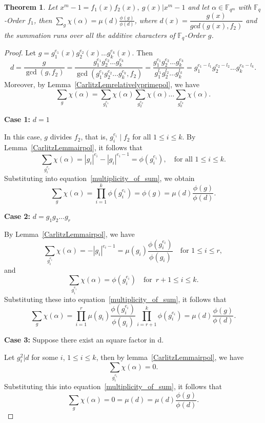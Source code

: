 \documentclass[12pt,a4paper]{article}
\theoremstyle{plain}
\newtheorem{thm}{Theorem}[section]
\theoremstyle{definition}
\numberwithin{equation}{section}
\begin{document}
    \begin{thm}\label{Sumaddi}
        Let $x^m-1 = f_1(x)f_2(x), ~g(x) \vert x^m-1$ and let $\alpha \in \mathbb{F}_{q^m}$ with $\mathbb{F}_q$-Order $f_1$, then
        $\displaystyle\sum_{g} \chi (\alpha) = \mu \left (d \right)\frac{\phi(g)}{\phi\left(d\right)}$, where $d(x) = \dfrac{g(x)}{gcd \left(g(x),f_2\right)}$ and the summation runs over all the additive characters of $\mathbb{F}_q$-Order $g$. 
    \end{thm}
    \begin{proof}
        Let \(g = g_1^{e_1}(x)g_2^{e_2}(x)\dots g_k^{e_k}(x)\). Then
        \[
        d = \frac{g}{\gcd(g, f_2)} = \frac{g_1^{e_1}g_2^{e_2}\dots g_k^{e_k}}{\gcd(g_1^{e_1}g_2^{e_2}\dots g_k^{e_k}, f_2)} = \frac{g_1^{e_1}g_2^{e_2}\dots g_k^{e_k}}{g_1^{l_1}g_2^{l_2}\dots g_k^{l_k}} = g_1^{e_1-l_1}g_2^{e_2-l_2}\dots g_k^{e_k-l_k}.\]
        Moreover, by Lemma~\ref{CarlitzLemrelativelyprimepol}, we have
        \begin{equation}
            \sum_{g} \chi(\alpha) = \sum_{g_1^{e_1}} \chi(\alpha) \sum_{g_2^{e_2}} \chi(\alpha) \dots \sum_{g_k^{e_k}} \chi(\alpha).
            \label{multiplicity_of_sum}
        \end{equation}

        \textbf{Case 1:} \(d = 1\)

        In this case, \(g\) divides \(f_2\), that is, \(g_i^{e_i} \mid f_2\) for all \(1 \leq i \leq k\). By Lemma~\ref{CarlitzLemmairpol}, it follows that
        \[
        \sum_{g_i^{e_i}} \chi(\alpha) = |g_i|^{e_i} - |g_i|^{e_i-1} = \phi(g_i^{e_i}), \quad \text{for all } 1 \leq i \leq k.
        \]
        Substituting into equation~\eqref{multiplicity_of_sum}, we obtain
        \[
        \sum_{g} \chi(\alpha) = \prod_{i=1}^{k} \phi(g_i^{e_i}) = \phi(g) = \mu(d)\frac{\phi(g)}{\phi(d)}.
        \]

        \textbf{Case 2:} \(d = g_1g_2\dots g_r\)

        By Lemma~\ref{CarlitzLemmairpol}, we have
        \[
        \sum_{g_i^{e_i}} \chi(\alpha) = -|g_i|^{e_i-1} = \mu(g_i) \frac{\phi(g_i^{e_i})}{\phi(g_i)} \quad \text{for } 1 \leq i \leq r,
        \]
        and
        \[
        \sum_{g_i^{e_i}} \chi(\alpha) = \phi(g_i^{e_i}) \quad \text{for } \, r+1 \leq i \leq k. 
        \]
        Substituting these into equation~\eqref{multiplicity_of_sum}, it follows that
        \[
        \sum_{g} \chi(\alpha) = \prod_{i=1}^{r} \mu(g_i) \frac{\phi(g_i^{e_i})}{\phi(g_i)} \prod_{i=r+1}^{k} \phi(g_i^{e_i}) = \mu(d) \frac{\phi(g)}{\phi(d)}.
        \]

        \textbf{Case 3:} Suppose there exist an square factor in d.

        Let $g_i^2 \vert d$ for some $i$, $1\leq i \leq k$, then by lemma~\ref{CarlitzLemmairpol}, we have
        \[
        \sum_{g_i^{e_i}} \chi(\alpha) = 0.
        \]
        Substituting this into equation~\eqref{multiplicity_of_sum}, it follows that
        \[\sum_{g} \chi(\alpha) = 0 = \mu(d) = \mu(d) \frac{\phi(g)}{\phi(d)}.\]
    \end{proof}
\end{document}
